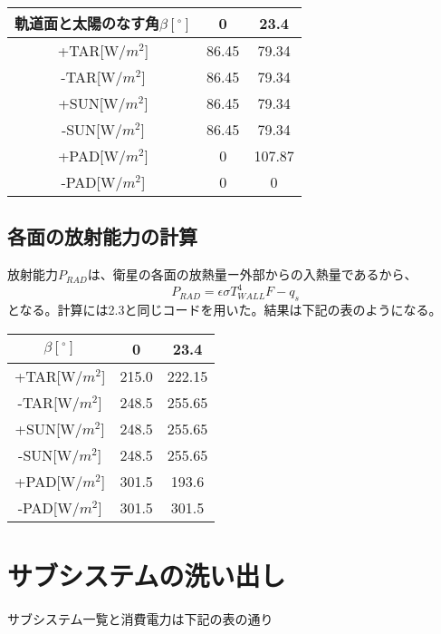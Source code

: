 \documentclass[15pt,uplatex,dvipdfmx]{jsarticle}
\begin{document}
\setlength{\tabcolsep}{.5zw}
\begin{tabularx}{40zw}{C|C C} \hline
  軌道面と太陽のなす角$\beta[^ \circ]$ & 0 & 23.4 \\ \hline
  +TAR[W/$m^2$] & 86.45 & 79.34 \\ \hline
  -TAR[W/$m^2$] & 86.45 & 79.34 \\ \hline
  +SUN[W/$m^2$] & 86.45 & 79.34 \\ \hline
  -SUN[W/$m^2$] & 86.45 & 79.34 \\ \hline
  +PAD[W/$m^2$] & 0 & 107.87 \\ \hline
  -PAD[W/$m^2$] & 0 & 0 \\ \hline
\end{tabularx}\par

\subsection{各面の放射能力の計算}
\setlength{\parskip}{0\baselineskip}
放射能力$P_{RAD}$は、衛星の各面の放熱量ー外部からの入熱量であるから、
\begin{equation}
  P_{RAD} = \epsilon \sigma T_{WALL}^4 F - q_s
\end{equation}
となる。計算には2.3と同じコードを用いた。結果は下記の表のようになる。\par
\setlength{\parskip}{1.0\baselineskip}

\setlength{\tabcolsep}{.5zw}
\begin{tabularx}{40zw}{C|C C} \hline
  $\beta[^ \circ]$ & 0 & 23.4 \\ \hline
  +TAR[W/$m^2$] & 215.0 & 222.15 \\ \hline
  -TAR[W/$m^2$] & 248.5 & 255.65 \\ \hline
  +SUN[W/$m^2$] & 248.5 & 255.65 \\ \hline
  -SUN[W/$m^2$] & 248.5 & 255.65\\ \hline
  +PAD[W/$m^2$] & 301.5 & 193.6 \\ \hline
  -PAD[W/$m^2$] & 301.5 & 301.5 \\ \hline
\end{tabularx}\par

\section{サブシステムの洗い出し}
\setlength{\parskip}{0\baselineskip}
サブシステム一覧と消費電力は下記の表の通り\par
\setlength{\parskip}{1.0\baselineskip}
\end{document}

